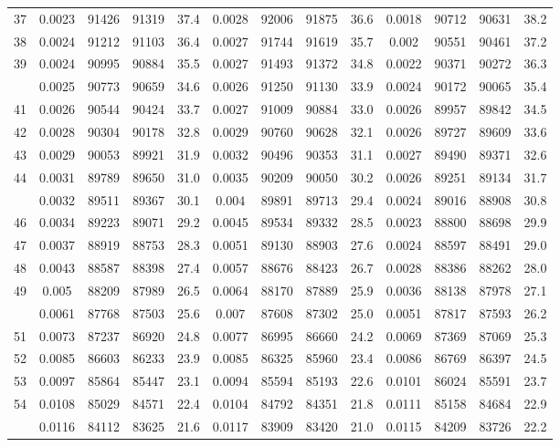\documentclass[
  14pt,
]{article}
\begin{document}
\begin{longtable}[t]{lcccccccccccc}
37 & 0.0023 & 91426 & 91319 & 37.4 & 0.0028 & 92006 & 91875 & 36.6 & 0.0018 & 90712 & 90631 & 38.2\\
38 & 0.0024 & 91212 & 91103 & 36.4 & 0.0027 & 91744 & 91619 & 35.7 & 0.002 & 90551 & 90461 & 37.2\\
39 & 0.0024 & 90995 & 90884 & 35.5 & 0.0027 & 91493 & 91372 & 34.8 & 0.0022 & 90371 & 90272 & 36.3\\
\addlinespace
40 & 0.0025 & 90773 & 90659 & 34.6 & 0.0026 & 91250 & 91130 & 33.9 & 0.0024 & 90172 & 90065 & 35.4\\
41 & 0.0026 & 90544 & 90424 & 33.7 & 0.0027 & 91009 & 90884 & 33.0 & 0.0026 & 89957 & 89842 & 34.5\\
42 & 0.0028 & 90304 & 90178 & 32.8 & 0.0029 & 90760 & 90628 & 32.1 & 0.0026 & 89727 & 89609 & 33.6\\
43 & 0.0029 & 90053 & 89921 & 31.9 & 0.0032 & 90496 & 90353 & 31.1 & 0.0027 & 89490 & 89371 & 32.6\\
44 & 0.0031 & 89789 & 89650 & 31.0 & 0.0035 & 90209 & 90050 & 30.2 & 0.0026 & 89251 & 89134 & 31.7\\
\addlinespace
45 & 0.0032 & 89511 & 89367 & 30.1 & 0.004 & 89891 & 89713 & 29.4 & 0.0024 & 89016 & 88908 & 30.8\\
46 & 0.0034 & 89223 & 89071 & 29.2 & 0.0045 & 89534 & 89332 & 28.5 & 0.0023 & 88800 & 88698 & 29.9\\
47 & 0.0037 & 88919 & 88753 & 28.3 & 0.0051 & 89130 & 88903 & 27.6 & 0.0024 & 88597 & 88491 & 29.0\\
48 & 0.0043 & 88587 & 88398 & 27.4 & 0.0057 & 88676 & 88423 & 26.7 & 0.0028 & 88386 & 88262 & 28.0\\
49 & 0.005 & 88209 & 87989 & 26.5 & 0.0064 & 88170 & 87889 & 25.9 & 0.0036 & 88138 & 87978 & 27.1\\
\addlinespace
50 & 0.0061 & 87768 & 87503 & 25.6 & 0.007 & 87608 & 87302 & 25.0 & 0.0051 & 87817 & 87593 & 26.2\\
51 & 0.0073 & 87237 & 86920 & 24.8 & 0.0077 & 86995 & 86660 & 24.2 & 0.0069 & 87369 & 87069 & 25.3\\
52 & 0.0085 & 86603 & 86233 & 23.9 & 0.0085 & 86325 & 85960 & 23.4 & 0.0086 & 86769 & 86397 & 24.5\\
53 & 0.0097 & 85864 & 85447 & 23.1 & 0.0094 & 85594 & 85193 & 22.6 & 0.0101 & 86024 & 85591 & 23.7\\
54 & 0.0108 & 85029 & 84571 & 22.4 & 0.0104 & 84792 & 84351 & 21.8 & 0.0111 & 85158 & 84684 & 22.9\\
\addlinespace
55 & 0.0116 & 84112 & 83625 & 21.6 & 0.0117 & 83909 & 83420 & 21.0 & 0.0115 & 84209 & 83726 & 22.2\\

\end{longtable}
\end{document}
